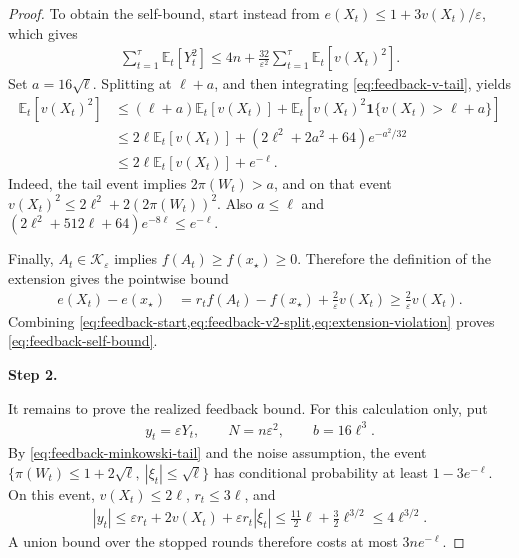\documentclass{article}
\newcommand{\proofstepinline}[1]{%
    {\normalfont\normalsize\bfseries\color{blue!55!black}Step #1.}\enspace
}
\newcommand{\E}{\mathbb E}
\newcommand{\K}{\mathcal K}
\newcommand{\1}{\mathbf 1}
\newcommand{\eps}{\varepsilon}
\begin{document}
\begin{proof}
    To obtain the self-bound, start instead from
    $e(X_t)\leq1+3v(X_t)/\eps$, which gives
    \begin{align}
        \sum_{t=1}^\tau\E_t[Y_t^2]
        \leq4n+\frac{32}{\eps^2}
        \sum_{t=1}^\tau\E_t[v(X_t)^2].
        \label{eq:feedback-start}
    \end{align}
    Set $a=16\sqrt\ell$. Splitting at $\ell+a$, and then integrating
    \eqref{eq:feedback-v-tail}, yields
    \begin{align}
        \E_t[v(X_t)^2]
         & \leq(\ell+a)\E_t[v(X_t)]
        +\E_t\left[v(X_t)^2\1\{v(X_t)>\ell+a\}\right]
        \\
         & \leq2\ell\E_t[v(X_t)]
        +\left(2\ell^2+2a^2+64\right)e^{-a^2/32}
        \\
         & \leq2\ell\E_t[v(X_t)]+e^{-\ell}.
        \label{eq:feedback-v2-split}
    \end{align}
    Indeed, the tail event implies $2\pi(W_t)>a$, and on that event
    $v(X_t)^2\leq2\ell^2+2(2\pi(W_t))^2$. Also $a\leq \ell$ and
    $(2\ell^2+512\ell+64)e^{-8\ell}\leq e^{-\ell}$.

    Finally, $A_t\in\K_\eps$ implies $f(A_t)\geq f(x_\star)\geq0$.
    Therefore the definition of the extension gives the pointwise bound
    \begin{align}
        e(X_t)-e(x_\star)
         & =r_tf(A_t)-f(x_\star)+\frac2\eps v(X_t)
        \geq\frac2\eps v(X_t).
        \label{eq:extension-violation}
    \end{align}
    Combining \cref{eq:feedback-start,eq:feedback-v2-split,eq:extension-violation}
    proves \eqref{eq:feedback-self-bound}.

    \proofstepinline{2}
    It remains to prove the realized feedback bound. For this calculation
    only, put
    \begin{align}
        y_t=\eps Y_t,
        \qquad N=n\eps^2,
        \qquad b=16\ell^3.
    \end{align}
    By \eqref{eq:feedback-minkowski-tail} and the noise assumption, the
    event
    $\{\pi(W_t)\leq1+2\sqrt\ell,\ |\xi_t|\leq\sqrt\ell\}$
    has conditional probability at least $1-3e^{-\ell}$.
    On this event, $v(X_t)\leq2\ell$, $r_t\leq3\ell$, and
    \begin{align}
        |y_t|
        \leq\eps r_t+2v(X_t)+\eps r_t|\xi_t|
        \leq\frac{11}{2}\ell+\frac32\ell^{3/2}
        \leq4\ell^{3/2}.
        \label{eq:feedback-cap}
    \end{align}
    A union bound over the stopped rounds therefore costs at most
    $3ne^{-\ell}$.


\end{proof}
\end{document}
